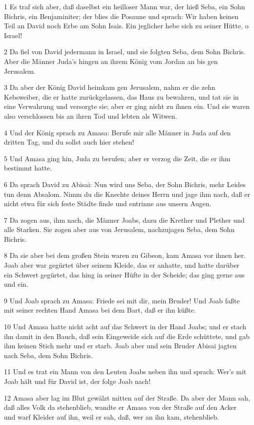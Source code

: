\par 1 Es traf sich aber, daß daselbst ein heilloser Mann war, der hieß Seba, ein Sohn Bichris, ein Benjaminiter; der blies die Posaune und sprach: Wir haben keinen Teil an David noch Erbe am Sohn Isais. Ein jeglicher hebe sich zu seiner Hütte, o Israel!
\par 2 Da fiel von David jedermann in Israel, und sie folgten Seba, dem Sohn Bichris. Aber die Männer Juda's hingen an ihrem König vom Jordan an bis gen Jerusalem.
\par 3 Da aber der König David heimkam gen Jerusalem, nahm er die zehn Kebsweiber, die er hatte zurückgelassen, das Haus zu bewahren, und tat sie in eine Verwahrung und versorgte sie; aber er ging nicht zu ihnen ein. Und sie waren also verschlossen bis an ihren Tod und lebten als Witwen.
\par 4 Und der König sprach zu Amasa: Berufe mir alle Männer in Juda auf den dritten Tag, und du sollst auch hier stehen!
\par 5 Und Amasa ging hin, Juda zu berufen; aber er verzog die Zeit, die er ihm bestimmt hatte.
\par 6 Da sprach David zu Abisai: Nun wird uns Seba, der Sohn Bichris, mehr Leides tun denn Absalom. Nimm du die Knechte deines Herrn und jage ihm nach, daß er nicht etwa für sich feste Städte finde und entrinne aus unsern Augen.
\par 7 Da zogen aus, ihm nach, die Männer Joabs, dazu die Krether und Plether und alle Starken. Sie zogen aber aus von Jerusalem, nachzujagen Seba, dem Sohn Bichris.
\par 8 Da sie aber bei dem großen Stein waren zu Gibeon, kam Amasa vor ihnen her. Joab aber war gegürtet über seinem Kleide, das er anhatte, und hatte darüber ein Schwert gegürtet, das hing in seiner Hüfte in der Scheide; das ging gerne aus und ein.
\par 9 Und Joab sprach zu Amasa: Friede sei mit dir, mein Bruder! Und Joab faßte mit seiner rechten Hand Amasa bei dem Bart, daß er ihn küßte.
\par 10 Und Amasa hatte nicht acht auf das Schwert in der Hand Joabs; und er stach ihn damit in den Bauch, daß sein Eingeweide sich auf die Erde schüttete, und gab ihm keinen Stich mehr und er starb. Joab aber und sein Bruder Abisai jagten nach Seba, dem Sohn Bichris.
\par 11 Und es trat ein Mann von den Leuten Joabs neben ihn und sprach: Wer's mit Joab hält und für David ist, der folge Joab nach!
\par 12 Amasa aber lag im Blut gewälzt mitten auf der Straße. Da aber der Mann sah, daß alles Volk da stehenblieb, wandte er Amasa von der Straße auf den Acker und warf Kleider auf ihn, weil er sah, daß, wer an ihn kam, stehenblieb.
